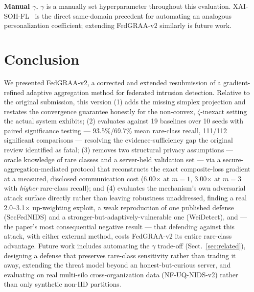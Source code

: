 \documentclass{llncs}
\begin{document}
\textbf{Manual $\gamma$.} $\gamma$ is a manually set hyperparameter throughout this evaluation. XAI-SOH-FL~\cite{XAISOHFL} is the direct same-domain precedent for automating an analogous personalization coefficient; extending FedGRAA-v2 similarly is future work.

\section{Conclusion}

We presented FedGRAA-v2, a corrected and extended resubmission of a gradient-refined adaptive aggregation method for federated intrusion detection. Relative to the original submission, this version (1) adds the missing simplex projection and restates the convergence guarantee honestly for the non-convex, $\zeta$-inexact setting the actual system exhibits; (2) evaluates against 19 baselines over 10 seeds with paired significance testing --- 93.5\%/69.7\% mean rare-class recall, 111/112 significant comparisons --- resolving the evidence-sufficiency gap the original review identified as fatal; (3) removes two structural privacy assumptions --- oracle knowledge of rare classes and a server-held validation set --- via a secure-aggregation-mediated protocol that reconstructs the exact composite-loss gradient at a measured, disclosed communication cost (6.00$\times$ at $m=1$, 3.00$\times$ at $m=3$ with \emph{higher} rare-class recall); and (4) evaluates the mechanism's own adversarial attack surface directly rather than leaving robustness unaddressed, finding a real 2.0--3.1$\times$ up-weighting exploit, a weak reproduction of one published defense (SecFedNIDS) and a stronger-but-adaptively-vulnerable one (WeiDetect), and --- the paper's most consequential negative result --- that defending against this attack, with either external method, costs FedGRAA-v2 its entire rare-class advantage. Future work includes automating the $\gamma$ trade-off (Sect.~\ref{sec:related}), designing a defense that preserves rare-class sensitivity rather than trading it away, extending the threat model beyond an honest-but-curious server, and evaluating on real multi-silo cross-organization data (NF-UQ-NIDS-v2) rather than only synthetic non-IID partitions.
\end{document}
